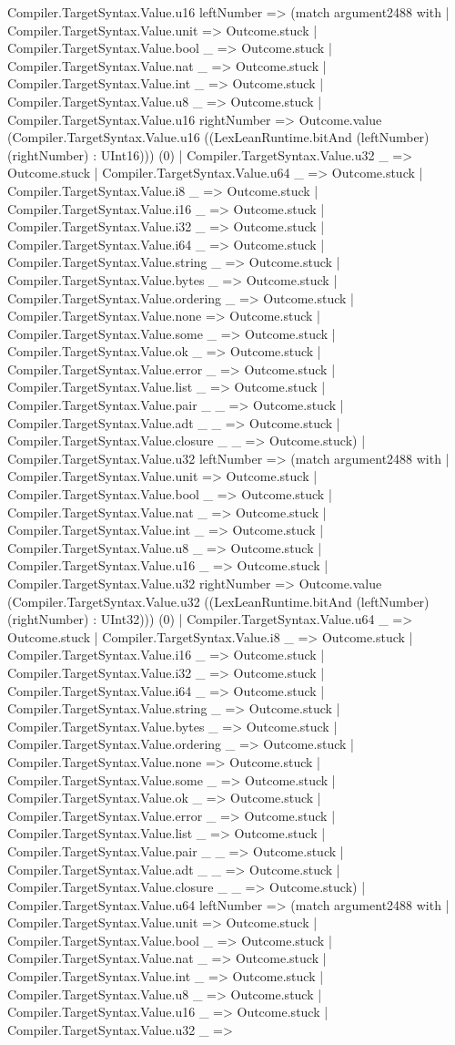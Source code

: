 \documentclass[11pt]{article}
\begin{document}
Compiler.TargetSyntax.Value.u16 leftNumber => (match argument2488 with | Compiler.TargetSyntax.Value.unit => Outcome.stuck | Compiler.TargetSyntax.Value.bool \_ => Outcome.stuck | Compiler.TargetSyntax.Value.nat \_ => Outcome.stuck | Compiler.TargetSyntax.Value.int \_ => Outcome.stuck | Compiler.TargetSyntax.Value.u8 \_ => Outcome.stuck | Compiler.TargetSyntax.Value.u16 rightNumber => Outcome.value (Compiler.TargetSyntax.Value.u16 ((LexLeanRuntime.bitAnd (leftNumber) (rightNumber) : UInt16))) (0) | Compiler.TargetSyntax.Value.u32 \_ => Outcome.stuck | Compiler.TargetSyntax.Value.u64 \_ => Outcome.stuck | Compiler.TargetSyntax.Value.i8 \_ => Outcome.stuck | Compiler.TargetSyntax.Value.i16 \_ => Outcome.stuck | Compiler.TargetSyntax.Value.i32 \_ => Outcome.stuck | Compiler.TargetSyntax.Value.i64 \_ => Outcome.stuck | Compiler.TargetSyntax.Value.string \_ => Outcome.stuck | Compiler.TargetSyntax.Value.bytes \_ => Outcome.stuck | Compiler.TargetSyntax.Value.ordering \_ => Outcome.stuck | Compiler.TargetSyntax.Value.none => Outcome.stuck | Compiler.TargetSyntax.Value.some \_ => Outcome.stuck | Compiler.TargetSyntax.Value.ok \_ => Outcome.stuck | Compiler.TargetSyntax.Value.error \_ => Outcome.stuck | Compiler.TargetSyntax.Value.list \_ => Outcome.stuck | Compiler.TargetSyntax.Value.pair \_ \_ => Outcome.stuck | Compiler.TargetSyntax.Value.adt \_ \_ => Outcome.stuck | Compiler.TargetSyntax.Value.closure \_ \_ => Outcome.stuck) | Compiler.TargetSyntax.Value.u32 leftNumber => (match argument2488 with | Compiler.TargetSyntax.Value.unit => Outcome.stuck | Compiler.TargetSyntax.Value.bool \_ => Outcome.stuck | Compiler.TargetSyntax.Value.nat \_ => Outcome.stuck | Compiler.TargetSyntax.Value.int \_ => Outcome.stuck | Compiler.TargetSyntax.Value.u8 \_ => Outcome.stuck | Compiler.TargetSyntax.Value.u16 \_ => Outcome.stuck | Compiler.TargetSyntax.Value.u32 rightNumber => Outcome.value (Compiler.TargetSyntax.Value.u32 ((LexLeanRuntime.bitAnd (leftNumber) (rightNumber) : UInt32))) (0) | Compiler.TargetSyntax.Value.u64 \_ => Outcome.stuck | Compiler.TargetSyntax.Value.i8 \_ => Outcome.stuck | Compiler.TargetSyntax.Value.i16 \_ => Outcome.stuck | Compiler.TargetSyntax.Value.i32 \_ => Outcome.stuck | Compiler.TargetSyntax.Value.i64 \_ => Outcome.stuck | Compiler.TargetSyntax.Value.string \_ => Outcome.stuck | Compiler.TargetSyntax.Value.bytes \_ => Outcome.stuck | Compiler.TargetSyntax.Value.ordering \_ => Outcome.stuck | Compiler.TargetSyntax.Value.none => Outcome.stuck | Compiler.TargetSyntax.Value.some \_ => Outcome.stuck | Compiler.TargetSyntax.Value.ok \_ => Outcome.stuck | Compiler.TargetSyntax.Value.error \_ => Outcome.stuck | Compiler.TargetSyntax.Value.list \_ => Outcome.stuck | Compiler.TargetSyntax.Value.pair \_ \_ => Outcome.stuck | Compiler.TargetSyntax.Value.adt \_ \_ => Outcome.stuck | Compiler.TargetSyntax.Value.closure \_ \_ => Outcome.stuck) | Compiler.TargetSyntax.Value.u64 leftNumber => (match argument2488 with | Compiler.TargetSyntax.Value.unit => Outcome.stuck | Compiler.TargetSyntax.Value.bool \_ => Outcome.stuck | Compiler.TargetSyntax.Value.nat \_ => Outcome.stuck | Compiler.TargetSyntax.Value.int \_ => Outcome.stuck | Compiler.TargetSyntax.Value.u8 \_ => Outcome.stuck | Compiler.TargetSyntax.Value.u16 \_ => Outcome.stuck | Compiler.TargetSyntax.Value.u32 \_ => 
\end{document}

